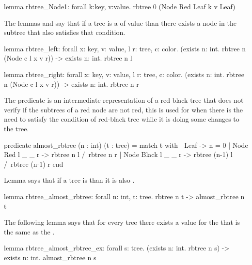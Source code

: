 \begin{whylang}
    lemma rbtree_Node1:
        forall k:key, v:value. rbtree 0 (Node Red Leaf k v Leaf)
\end{whylang}

The lemmas  and  say that if a tree  is a 
of value  than there exists a node in the subtree that also satisfies that  condition.

\begin{whylang}
    lemma rbtree_left:
        forall x: key, v: value, l r: tree, c: color.
        (exists n: int. rbtree n (Node c l x v r)) -> exists n: int. rbtree n l

    lemma rbtree_right:
        forall x: key, v: value, l r: tree, c: color.
        (exists n: int. rbtree n (Node c l x v r)) -> exists n: int. rbtree n r
\end{whylang}

The predicate  is an intermediate representation of a red-black tree that does not verify if the subtrees of
a red node are not red, this is used for when there is the need to satisfy the condition of red-black tree while it is doing some changes
to the tree.

\begin{whylang}
    predicate almost_rbtree (n : int) (t : tree) =
        match t with
        | Leaf ->
            n = 0
        | Node Red   l _ _ r ->
            rbtree n l /\ rbtree n r
        | Node Black l _ _ r ->
            rbtree (n-1) l /\ rbtree (n-1) r
        end
\end{whylang}

Lemma  says that if a tree is  than it is also .

\begin{whylang}
    lemma rbtree_almost_rbtree:
        forall n: int, t: tree. rbtree n t -> almost_rbtree n t
\end{whylang}

The following lemma  says that for every tree there exists a value for the  that
is the same as the .

\begin{whylang}
    lemma rbtree_almost_rbtree_ex:
        forall s: tree.
        (exists n: int. rbtree n s) -> exists n: int. almost_rbtree n s
\end{whylang}

